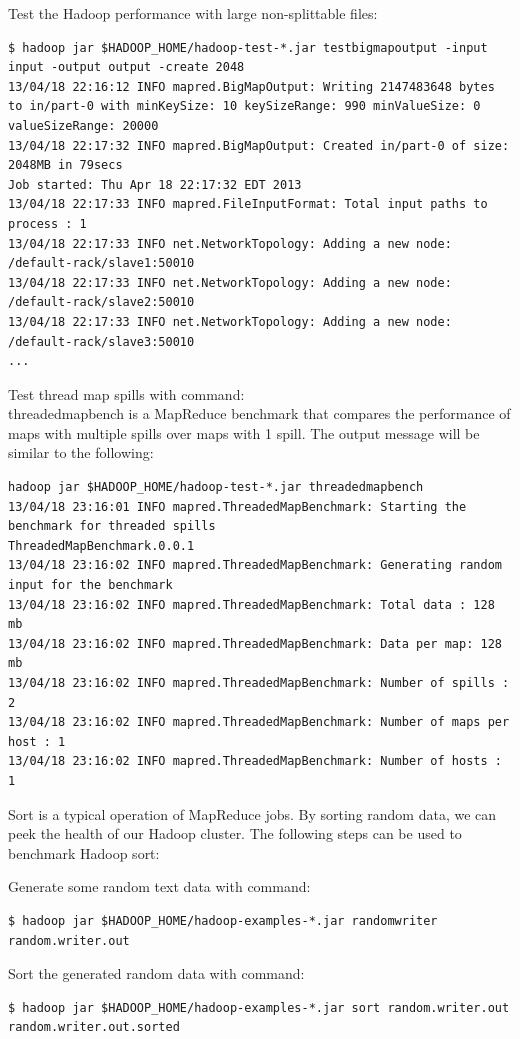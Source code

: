 Test the Hadoop performance with large non-splittable files:
\lstset{style=bashstyle}
\begin{lstlisting}
$ hadoop jar $HADOOP_HOME/hadoop-test-*.jar testbigmapoutput -input input -output output -create 2048
13/04/18 22:16:12 INFO mapred.BigMapOutput: Writing 2147483648 bytes to in/part-0 with minKeySize: 10 keySizeRange: 990 minValueSize: 0 valueSizeRange: 20000
13/04/18 22:17:32 INFO mapred.BigMapOutput: Created in/part-0 of size: 2048MB in 79secs
Job started: Thu Apr 18 22:17:32 EDT 2013
13/04/18 22:17:33 INFO mapred.FileInputFormat: Total input paths to process : 1
13/04/18 22:17:33 INFO net.NetworkTopology: Adding a new node: /default-rack/slave1:50010
13/04/18 22:17:33 INFO net.NetworkTopology: Adding a new node: /default-rack/slave2:50010
13/04/18 22:17:33 INFO net.NetworkTopology: Adding a new node: /default-rack/slave3:50010
...
\end{lstlisting}

Test thread map spills with command: \\
threadedmapbench is a MapReduce benchmark that compares the performance of maps with multiple spills over maps with 1 spill. The output message will be similar to the following:
\lstset{style=bashstyle}
\begin{lstlisting}
hadoop jar $HADOOP_HOME/hadoop-test-*.jar threadedmapbench
13/04/18 23:16:01 INFO mapred.ThreadedMapBenchmark: Starting the benchmark for threaded spills
ThreadedMapBenchmark.0.0.1
13/04/18 23:16:02 INFO mapred.ThreadedMapBenchmark: Generating random input for the benchmark
13/04/18 23:16:02 INFO mapred.ThreadedMapBenchmark: Total data : 128 mb
13/04/18 23:16:02 INFO mapred.ThreadedMapBenchmark: Data per map: 128 mb
13/04/18 23:16:02 INFO mapred.ThreadedMapBenchmark: Number of spills : 2
13/04/18 23:16:02 INFO mapred.ThreadedMapBenchmark: Number of maps per host : 1
13/04/18 23:16:02 INFO mapred.ThreadedMapBenchmark: Number of hosts : 1
\end{lstlisting}
Sort is a typical operation of MapReduce jobs. By sorting random data, we can peek the health of our Hadoop cluster. The following steps can be used to benchmark Hadoop sort:

Generate some random text data with command:
\lstset{style=bashstyle}
\begin{lstlisting}
$ hadoop jar $HADOOP_HOME/hadoop-examples-*.jar randomwriter random.writer.out
\end{lstlisting}

Sort the generated random data with command:
\lstset{style=bashstyle}
\begin{lstlisting}
$ hadoop jar $HADOOP_HOME/hadoop-examples-*.jar sort random.writer.out random.writer.out.sorted
\end{lstlisting}

